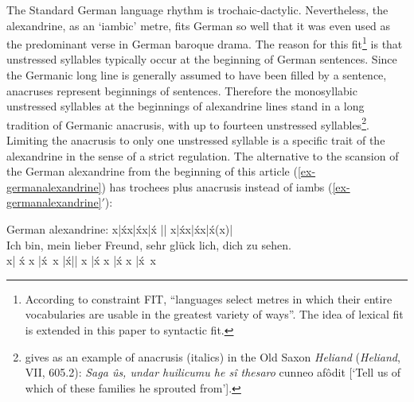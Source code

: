 \documentclass[output=paper
  ,nobabel
  ,uniformtopskip %
]{langscibook}
\begin{document}
The Standard German language rhythm is trochaic-dactylic. Nevertheless, the alexandrine, as an
`iambic' metre, fits German so well that it was even used as the predominant verse in German baroque
drama. The reason for this fit\footnote{According to \citep[294]{HansonKiparsky1996} constraint FIT,
  ``languages select metres in which their entire vocabularies are usable in the greatest variety of
  ways''. The idea of lexical fit is extended in this paper to syntactic fit.} is that unstressed
syllables typically occur at the beginning of German sentences. Since the Germanic long line is
generally assumed to have been filled by a sentence, anacruses represent beginnings of
sentences. Therefore the monosyllabic unstressed syllables at the beginnings of alexandrine lines
stand in a long tradition of Germanic anacrusis, with up to fourteen unstressed
syllables\footnote{\citet*[§216]{Heusler1925} gives as an example of anacrusis (italics) in the
  Old Saxon \textit{Heliand} (\textit{Heliand}, VII, 605.2): \emph{Saga ûs, undar huilicumu he
    sî thesaro} cunneo afôdit [`Tell us of which of these families he sprouted from'].}. 
Limiting the anacrusis to only one unstressed syllable is a specific trait of the alexandrine in the sense of
a strict regulation. The alternative to the scansion of the German alexandrine from the beginning of this article (\ref{ex-germanalexandrine}) has trochees plus anacrusis instead of iambs (\ref{ex-germanalexandrine}$'$):

{
\begin{exe}
German alexandrine: x|x́x|x́x|x́ || x|x́x|x́x|x́(x)|\\
\gll Ich  bin,  mein  lieber  Freund,           sehr  glück  lich,  dich  zu  sehen.\\
     x|	  x́	x     |x́~x    |x́\hspace{23pt}|| x     |x́     x	    |x́	  x	|x́~x\\
\end{exe}}
\end{document}
